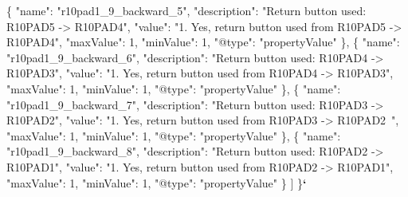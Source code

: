 \documentclass[
]{book}
\newenvironment{Shaded}{\begin{snugshade}}{\end{snugshade}}
\newcommand{\DataTypeTok}[1]{\textcolor[rgb]{0.13,0.29,0.53}{#1}}
\newcommand{\DecValTok}[1]{\textcolor[rgb]{0.00,0.00,0.81}{#1}}
\newcommand{\ErrorTok}[1]{\textcolor[rgb]{0.64,0.00,0.00}{\textbf{#1}}}
\newcommand{\FunctionTok}[1]{\textcolor[rgb]{0.00,0.00,0.00}{#1}}
\newcommand{\OtherTok}[1]{\textcolor[rgb]{0.56,0.35,0.01}{#1}}
\newcommand{\StringTok}[1]{\textcolor[rgb]{0.31,0.60,0.02}{#1}}
\begin{document}
\begin{Shaded}
\begin{Highlighting}[]
    \FunctionTok{\{}
      \DataTypeTok{"name"}\FunctionTok{:} \StringTok{"r10pad1_9_backward_5"}\FunctionTok{,}
      \DataTypeTok{"description"}\FunctionTok{:} \StringTok{"Return button used: R10PAD5 -> R10PAD4"}\FunctionTok{,}
      \DataTypeTok{"value"}\FunctionTok{:} \StringTok{"1. Yes, return button used from R10PAD5 -> R10PAD4"}\FunctionTok{,}
      \DataTypeTok{"maxValue"}\FunctionTok{:} \DecValTok{1}\FunctionTok{,}
      \DataTypeTok{"minValue"}\FunctionTok{:} \DecValTok{1}\FunctionTok{,}
      \DataTypeTok{"@type"}\FunctionTok{:} \StringTok{"propertyValue"}
    \FunctionTok{\}}\OtherTok{,}
    \FunctionTok{\{}
      \DataTypeTok{"name"}\FunctionTok{:} \StringTok{"r10pad1_9_backward_6"}\FunctionTok{,}
      \DataTypeTok{"description"}\FunctionTok{:} \StringTok{"Return button used: R10PAD4 -> R10PAD3"}\FunctionTok{,}
      \DataTypeTok{"value"}\FunctionTok{:} \StringTok{"1. Yes, return button used from R10PAD4 -> R10PAD3"}\FunctionTok{,}
      \DataTypeTok{"maxValue"}\FunctionTok{:} \DecValTok{1}\FunctionTok{,}
      \DataTypeTok{"minValue"}\FunctionTok{:} \DecValTok{1}\FunctionTok{,}
      \DataTypeTok{"@type"}\FunctionTok{:} \StringTok{"propertyValue"}
    \FunctionTok{\}}\OtherTok{,}
    \FunctionTok{\{}
      \DataTypeTok{"name"}\FunctionTok{:} \StringTok{"r10pad1_9_backward_7"}\FunctionTok{,}
      \DataTypeTok{"description"}\FunctionTok{:} \StringTok{"Return button used: R10PAD3 -> R10PAD2"}\FunctionTok{,}
      \DataTypeTok{"value"}\FunctionTok{:} \StringTok{"1. Yes, return button used from R10PAD3 -> R10PAD2 "}\FunctionTok{,}
      \DataTypeTok{"maxValue"}\FunctionTok{:} \DecValTok{1}\FunctionTok{,}
      \DataTypeTok{"minValue"}\FunctionTok{:} \DecValTok{1}\FunctionTok{,}
      \DataTypeTok{"@type"}\FunctionTok{:} \StringTok{"propertyValue"}
    \FunctionTok{\}}\OtherTok{,}
    \FunctionTok{\{}
      \DataTypeTok{"name"}\FunctionTok{:} \StringTok{"r10pad1_9_backward_8"}\FunctionTok{,}
      \DataTypeTok{"description"}\FunctionTok{:} \StringTok{"Return button used: R10PAD2 -> R10PAD1"}\FunctionTok{,}
      \DataTypeTok{"value"}\FunctionTok{:} \StringTok{"1. Yes, return button used from R10PAD2 -> R10PAD1"}\FunctionTok{,}
      \DataTypeTok{"maxValue"}\FunctionTok{:} \DecValTok{1}\FunctionTok{,}
      \DataTypeTok{"minValue"}\FunctionTok{:} \DecValTok{1}\FunctionTok{,}
      \DataTypeTok{"@type"}\FunctionTok{:} \StringTok{"propertyValue"}
    \FunctionTok{\}}
  \OtherTok{]}
\FunctionTok{\}}\ErrorTok{`}
\end{Highlighting}
\end{Shaded}
\end{document}
